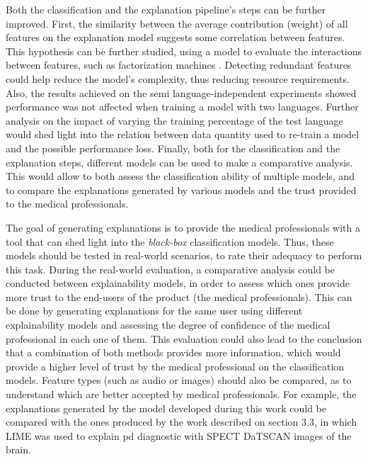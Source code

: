 Both the classification and the explanation pipeline's steps can be further improved. First, the similarity between the average contribution (weight) of all features on the explanation model suggests some correlation between features. This hypothesis can be further studied, using a model to evaluate the interactions between features, such as factorization machines \cite{factorizationmachines}. Detecting redundant features could help reduce the model's complexity, thus reducing resource requirements. Also, the results achieved on the semi language-independent experiments showed performance was not affected when training a model with two languages. Further analysis on the impact of varying the training percentage of the test language would shed light into the relation between data quantity used to re-train a model and the possible performance loss. Finally, both for the classification and the explanation steps, different models can be used to make a comparative analysis. This would allow to both assess the classification ability of multiple models, and to compare the explanations generated by various models and the trust provided to the medical professionals.

The goal of generating explanations is to provide the medical professionals with a tool that can shed light into the \textit{black-box} classification models. Thus, these models should be tested in real-world scenarios, to rate their adequacy to perform this task. During the real-world evaluation, a comparative analysis could be conducted between explainability models, in order to assess which ones provide more trust to the end-users of the product (the medical professionals). This can be done by generating explanations for the same user using different explainability models and assessing the degree of confidence of the medical professional in each one of them. This evaluation could also lead to the conclusion that a combination of both methods provides more information, which would provide a higher level of trust by the medical professional on the classification models. Feature types (such as audio or images) should also be compared, as to understand which are better accepted by medical professionals. For example, the explanations generated by the model developed during this work could be compared with the ones produced by the work described on section 3.3, in which LIME was used to explain \gls{pd} diagnostic with SPECT DaTSCAN images of the brain.


